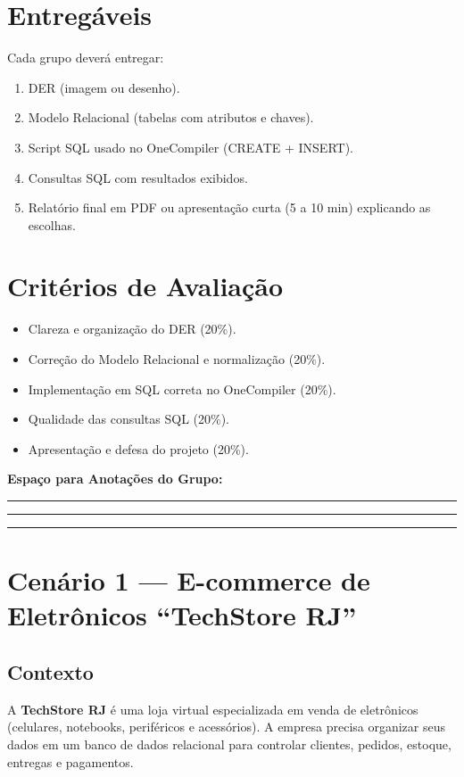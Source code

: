 \documentclass[12pt,a4paper]{article}
\begin{document}
\section*{Entregáveis}
Cada grupo deverá entregar:
\begin{enumerate}
    \item DER (imagem ou desenho).
    \item Modelo Relacional (tabelas com atributos e chaves).
    \item Script SQL usado no OneCompiler (CREATE + INSERT).
    \item Consultas SQL com resultados exibidos.
    \item Relatório final em PDF ou apresentação curta (5 a 10 min) explicando as escolhas.
\end{enumerate}

\section*{Critérios de Avaliação}
\begin{itemize}
    \item Clareza e organização do DER (20\%).
    \item Correção do Modelo Relacional e normalização (20\%).
    \item Implementação em SQL correta no OneCompiler (20\%).
    \item Qualidade das consultas SQL (20\%).
    \item Apresentação e defesa do projeto (20\%).
\end{itemize}

\vspace{0.5cm}
\noindent \textbf{Espaço para Anotações do Grupo:}
\vspace{3cm}

\noindent\rule{\textwidth}{0.4pt}
\vspace{2cm}

\noindent \rule{\textwidth}{0.4pt}
\vspace{2cm}

\noindent \rule{\textwidth}{0.4pt}

\newpage
\section*{Cenário 1 — E-commerce de Eletrônicos ``TechStore RJ''}

\subsection*{Contexto}
A \textbf{TechStore RJ} é uma loja virtual especializada em venda de eletrônicos (celulares, notebooks, periféricos e acessórios).  
A empresa precisa organizar seus dados em um banco de dados relacional para controlar clientes, pedidos, estoque, entregas e pagamentos.
\end{document}
